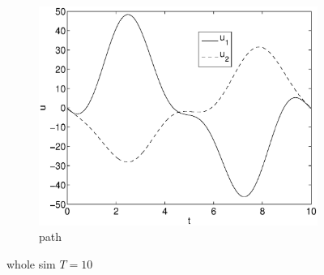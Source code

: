 \begin{figure}[h]
\begin{subfigure}[b]{\textwidth}
\centering
\includegraphics[height=0.3\textheight]{img/final_1_15_10_u.eps}
\caption{path}
\end{subfigure}
\caption{whole sim $T=10$}
\end{figure}

